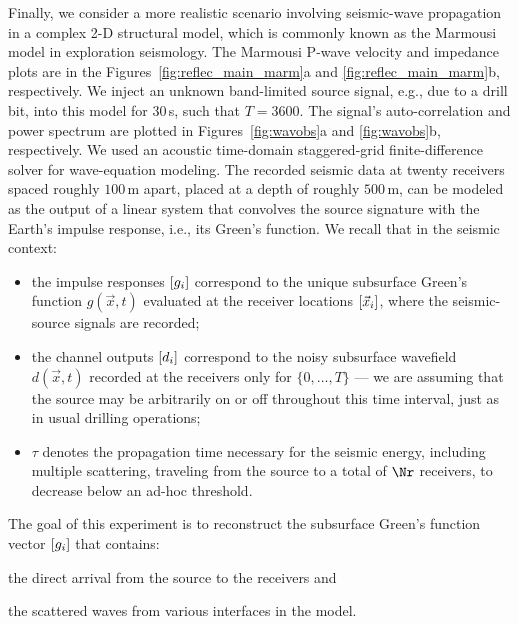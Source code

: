 %
Finally, we consider a more realistic scenario 
involving seismic-wave propagation
in a 
complex 2-D structural model, which is 
commonly known as the Marmousi model \citep{brougois1990marmousi} 
in exploration seismology. 
%
The Marmousi 
P-wave velocity and impedance plots are  
in the Figures~\ref{fig:reflec_main_marm}a and \ref{fig:reflec_main_marm}b, respectively.
%
We inject an unknown band-limited source signal, e.g., due to a drill bit,
into this model for $30\,$s, such that $T=3600$. 
%
The signal's auto-correlation 
and power spectrum are plotted in Figures~\ref{fig:wavobs}a and \ref{fig:wavobs}b, respectively.
%
We used an acoustic time-domain 
staggered-grid finite-difference solver for wave-equation modeling.
%
The recorded seismic data 
at twenty %
receivers spaced roughly $100\,$m apart, placed at a depth of roughly $500\,$m,
can be modeled as
the output of a linear system that convolves the source signature
with the Earth's
impulse response, i.e., its Green's function.
%
We recall that
in the seismic context:
\begin{itemize}

	\item the impulse responses $[g_i]$ correspond 
	to the 
	unique subsurface Green's function {$g(\vec{x},t)$} 
	evaluated at the receiver locations {$[\vec{x}_i]$},
	where the seismic-source signals are recorded;

	\item the channel outputs $[d_i]$ correspond to 
		the noisy subsurface wavefield $d(\vec{x},t)$ 
	recorded at the receivers 
		only for $\{0,\ldots,T\}$ ---  
		we are assuming that the source may be arbitrarily on or off %
	throughout this time interval, just as in usual drilling operations;

	\item $\tau$ denotes the propagation time
	necessary for the 
	seismic energy,
	including multiple scattering, 
	traveling 
	from the source to a total of $\Nr$ receivers,
	to decrease below an ad-hoc threshold.
\end{itemize}
The goal of 
this experiment
is to reconstruct the subsurface Green's function vector $[g_{i}]$ 
that contains:
\begin{inparaenum}
	\item the direct arrival from the source to the receivers and
\item   the scattered waves from
	various interfaces in the model.
\end{inparaenum}
